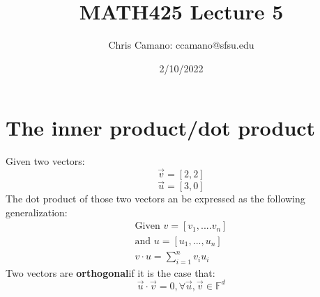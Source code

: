 \documentclass[12pt,a4paper]{article}
\author{Chris Camano: ccamano@sfsu.edu}
\title{MATH425 Lecture 5 }
\date{2/10/2022}
\begin{document}
\maketitle
\section{The inner product/dot product}
Given two vectors:
\[
  \vec{v}=[2,2]
\]
\[
  \vec{u}=[3,0]
\]
The dot product of those two vectors an be expressed as the following generalization:
\begin{align*}
    \text{Given } v=[v_1,....v_n]\\
    \text{and } u= [u_1,...,u_n]\\
    v \cdot u=\sum_{i=1}^{n}v_iu_i
\end{align*}
Two vectors are \textbf{orthogonal}if it is the case that:
\[
  \vec{u} \cdot \vec{v} =0 , \forall \vec{u},\vec{v} \in \mathbb{F}^d
\]

\]
\end{document}
